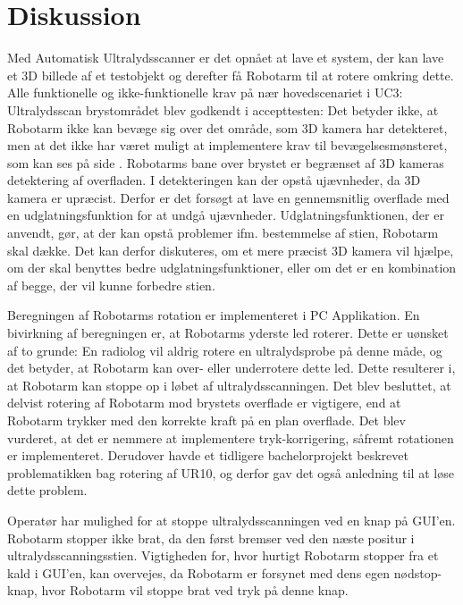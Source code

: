 \chapter{Diskussion}\label{kapitel_Diskussion}
Med Automatisk Ultralydsscanner er det opnået at lave et system, der kan lave et 3D billede af et testobjekt og derefter få Robotarm til at rotere omkring dette. Alle funktionelle og ikke-funktionelle krav på nær hovedscenariet i UC3: Ultralydsscan brystområdet blev godkendt i accepttesten: Det betyder ikke, at Robotarm ikke kan bevæge sig over det område, som 3D kamera har detekteret, men at det ikke har været muligt at implementere krav til bevægelsesmønsteret, som kan ses på side \pageref{Probensbevagelse}. Robotarms bane over brystet er begrænset af 3D kameras detektering af overfladen. I detekteringen kan der opstå ujævnheder, da 3D kamera er upræcist. Derfor er det forsøgt at lave en gennemsnitlig overflade med en udglatningsfunktion for at undgå ujævnheder. Udglatningsfunktionen, der er anvendt, gør, at der kan opstå problemer ifm. bestemmelse af stien, Robotarm skal dække. Det kan derfor diskuteres, om et mere præcist 3D kamera vil hjælpe, om der skal benyttes bedre udglatningsfunktioner, eller om det er en kombination af begge, der vil kunne forbedre stien. 

Beregningen af Robotarms rotation er implementeret i PC Applikation. En bivirkning af beregningen er, at Robotarms yderste led roterer. Dette er uønsket af to grunde: En radiolog vil aldrig rotere en ultralydsprobe på denne måde, og det betyder, at Robotarm kan over- eller underrotere dette led. Dette resulterer i, at Robotarm kan stoppe op i løbet af ultralydsscanningen. Det blev besluttet, at delvist rotering af Robotarm mod brystets overflade er vigtigere, end at Robotarm trykker med den korrekte kraft på en plan overflade. Det blev vurderet, at det er nemmere at implementere tryk-korrigering, såfremt rotationen  er implementeret. Derudover havde et tidligere bachelorprojekt beskrevet problematikken bag rotering af UR10, og derfor gav det også anledning til at løse dette problem.

Operatør har mulighed for at stoppe ultralydsscanningen ved en knap på GUI'en. Robotarm stopper ikke brat, da den først bremser ved den næste positur i ultralydsscanningsstien. Vigtigheden for, hvor hurtigt Robotarm stopper fra et kald i GUI'en, kan overvejes, da Robotarm er forsynet med dens egen nødstop-knap, hvor Robotarm vil stoppe brat ved tryk på denne knap.

